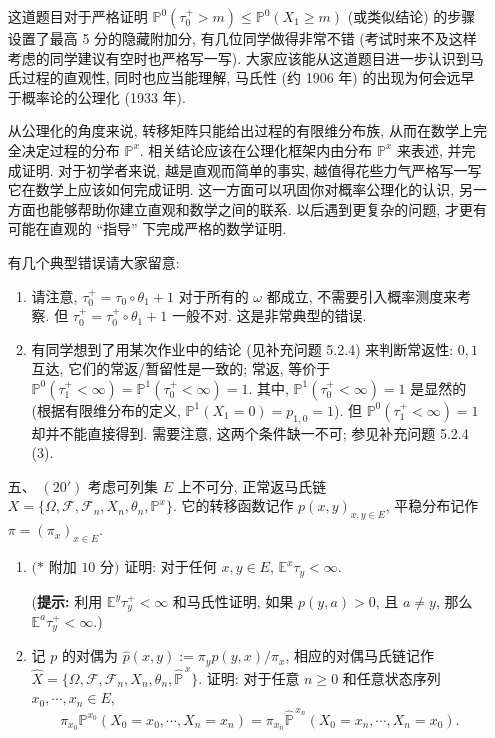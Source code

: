 \begin{enumerate}
\begin{proofc}[证明]
        这道题目对于严格证明 $\mathbb P^0(\tau_0^+>m)\leq \mathbb P^0(X_1\geq m)$ (或类似结论) 的步骤设置了最高 5 分的隐藏附加分, 有几位同学做得非常不错 (考试时来不及这样考虑的同学建议有空时也严格写一写). 大家应该能从这道题目进一步认识到马氏过程的直观性, 同时也应当能理解, 马氏性 (约 1906 年) 的出现为何会远早于概率论的公理化 (1933 年). 
        
        从公理化的角度来说, 转移矩阵只能给出过程的有限维分布族, 从而在数学上完全决定过程的分布 $\mathbb P^x$. 相关结论应该在公理化框架内由分布 $\mathbb P^x$ 来表述, 并完成证明. 对于初学者来说, 越是直观而简单的事实, 越值得花些力气严格写一写它在数学上应该如何完成证明. 这一方面可以巩固你对概率公理化的认识, 另一方面也能够帮助你建立直观和数学之间的联系. 以后遇到更复杂的问题, 才更有可能在直观的 “指导” 下完成严格的数学证明. 
        
        有几个典型错误请大家留意: 
        \begin{enumerate}[label=(\arabic*)] 
            \item 请注意, $\tau_0^+=\tau_0\circ\theta_1+1$ 对于所有的 $\omega$ 都成立, 不需要引入概率测度来考察. 但 $\tau_0^+=\tau_0^+\circ\theta_1+1$ 一般不对. 这是非常典型的错误. 
            \item 有同学想到了用某次作业中的结论 (见补充问题 5.2.4) 来判断常返性: $0,1$ 互达, 它们的常返/暂留性是一致的; 常返, 等价于 $\mathbb P^0(\tau_1^+<\infty)=\mathbb P^1(\tau_0^+<\infty)=1$. 其中, $\mathbb P^1(\tau_0^+<\infty)=1$ 是显然的 (根据有限维分布的定义, $\mathbb P^1(X_1=0)=p_{1,0}=1$). 但 $\mathbb P^0(\tau_1^+<\infty)=1$ 却并不能直接得到. 需要注意, 这两个条件缺一不可; 参见补充问题 5.2.4 (3). 
        \end{enumerate}
    \end{proofc}

    \item[五、]$(20')$ 考虑可列集 $E$ 上不可分, 正常返马氏链
    $X=\{\Omega,\mathscr F,\mathscr F_n,X_n,\theta_n,\mathbb P^x\}$.
    它的转移函数记作 $p(x,y)_{x,y\in E}$, 平稳分布记作 $\pi=(\pi_x)_{x\in E}$.
    \begin{enumerate}[label=(\arabic*)]
        \item $(*$ 附加 $10$ 分$)$ 证明: 对于任何 $x,y\in E$, $\mathbb E^x\tau_y<\infty$.

        (\textbf{提示:} 利用 $\mathbb E^y\tau_y^+<\infty$ 和马氏性证明, 
        如果 $p(y,a)>0$, 且 $a\neq y$, 那么 $\mathbb E^a\tau_y^+<\infty$.)

        \item 记 $p$ 的对偶为 $\widehat p(x,y):=\pi_y p(y,x)/\pi_x$, 相应的对偶马氏链记作
        $\widehat X=\{\Omega,\mathscr F,\mathscr F_n,X_n,\theta_n,\widehat{\mathbb P}^{\,x}\}$.
        证明: 对于任意 $n\geq 0$ 和任意状态序列 $x_0,\cdots,x_n\in E$,
        \[
            \pi_{x_0}\mathbb P^{x_0}(X_0=x_0,\cdots,X_n=x_n)
            =
            \pi_{x_n}\widehat{\mathbb P}^{\,x_n}(X_0=x_n,\cdots,X_n=x_0).
        \]


\end{enumerate}
\end{enumerate}

